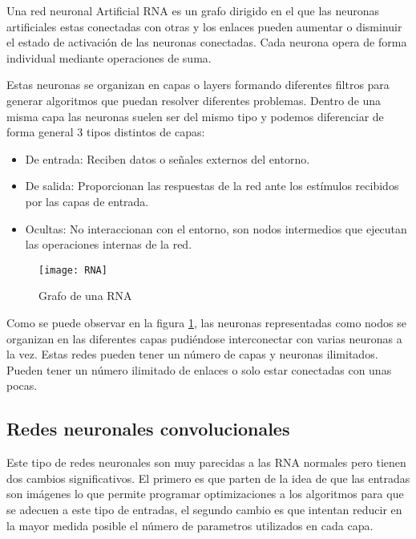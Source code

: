Una red neuronal Artificial RNA es un grafo dirigido en el que las neuronas artificiales estas conectadas con otras y los enlaces pueden aumentar o disminuir el estado de activación de las neuronas conectadas. Cada neurona opera de forma individual mediante operaciones de suma.\cite{wiki:redesNeuronalesArtificiales}

Estas neuronas se organizan en capas o layers formando diferentes filtros para generar algoritmos que puedan resolver diferentes problemas. Dentro de una misma capa las neuronas suelen ser del mismo tipo y podemos diferenciar de forma general 3 tipos distintos de capas:

\begin{itemize}
	\item{De entrada}: Reciben datos o señales externos del entorno.
	\item{De salida}: Proporcionan las respuestas de la red ante los estímulos recibidos por las capas de entrada.
	\item{Ocultas}: No interaccionan con el entorno, son nodos intermedios que ejecutan las operaciones internas de la red.
\end{itemize}

\begin{figure}[h]
    \begin{center}%
        \begin{center}%
          \texttt{[image: RNA]}%
          \caption{Grafo de una RNA}%
          \label{figRNA}%
        \end{center}%
  	\end{center}%
\end{figure}%

Como se puede observar en la figura \ref{figRNA}, las neuronas representadas como nodos se organizan en las diferentes capas pudiéndose interconectar con varias neuronas a la vez. Estas redes pueden tener un número de capas y neuronas ilimitados. Pueden tener un número ilimitado de enlaces o solo estar conectadas con unas pocas.

\newpage
\subsection{Redes neuronales convolucionales}

Este tipo de redes neuronales son muy parecidas a las RNA normales pero tienen dos cambios significativos. El primero es que parten de la idea de que las entradas son imágenes lo que permite programar optimizaciones a los algoritmos para que se adecuen a este tipo de entradas, el segundo cambio es que intentan reducir en la mayor medida posible el número de parametros utilizados en cada capa.\cite{redesNeuronalesConvolucionales}

